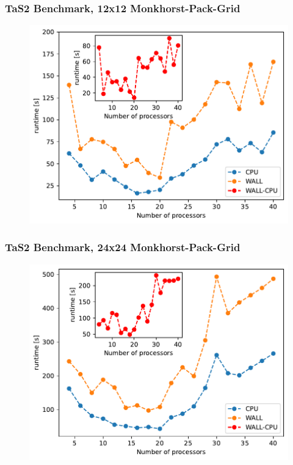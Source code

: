 \documentclass{beamer}
\begin{document}
\begin{frame}
    \frametitle{TaS2 Benchmark, 12x12 Monkhorst-Pack-Grid}
    \begin{figure}
        \includegraphics[width=\linewidth, height=\textheight,keepaspectratio]{TaS2_bench_nprocs_12x12.pdf}
    \end{figure}
\end{frame}

\begin{frame}
    \frametitle{TaS2 Benchmark, 24x24 Monkhorst-Pack-Grid}
    \begin{figure}
        \includegraphics[width=\linewidth, height=\textheight,keepaspectratio]{TaS2_bench_nprocs_24x24.pdf}
    \end{figure}
\end{frame}
\end{document}
